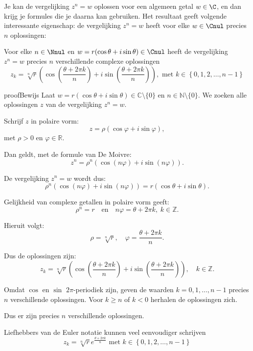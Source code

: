 \documentclass{ximera}
\begin{document}
Je kan de vergelijking $z^n=w$ oplossen voor een algemeen getal $w\in\C$, en dan krijg je formules die je daarna kan gebruiken. 
Het resultaat geeft volgende interessante eigenschap: de vergelijking $z^n=w$ heeft voor elke $w\in\Cnul$ precies $n$ oplossingen:

\begin{proposition}
    Voor elke $n\in\Nnul$ en $w=r(\cos\theta+i\sin\theta) \in\Cnul$ heeft de vergelijking $z^n = w$ precies $n$ verschillende complexe oplossingen
    $$
    z_k = \sqrt[n]{r}\left( \cos\left( \frac{\theta + 2\pi k}{n}\right) + i\sin\left( \frac{\theta + 2\pi k}{n}\right) \right), \text{ met } k\in\left\{0,1,2,\ldots,n-1\right\}
    $$
\end{proposition}

\begin{expandable}{proof}{Bewijs}
Laat $w = r(\cos\theta + i\sin\theta) \in \mathbb{C}\setminus\{0\}$ en $n \in \mathbb{N}\setminus\{0\}$.
We zoeken alle oplossingen $z$ van de vergelijking $z^n = w$.

Schrijf $z$ in polaire vorm:
$$
z = \rho(\cos\varphi + i\sin\varphi),
$$
met $\rho > 0$ en $\varphi \in \mathbb{R}$.

Dan geldt, met de formule van De Moivre:
$$
z^n = \rho^n \left( \cos(n\varphi) + i\sin(n\varphi) \right).
$$

De vergelijking $z^n = w$ wordt dus:
$$
\rho^n \left( \cos(n\varphi) + i\sin(n\varphi) \right)
= r(\cos\theta + i\sin\theta).
$$

Gelijkheid van complexe getallen in polaire vorm geeft:
$$
\rho^n = r \quad \text{en} \quad n\varphi = \theta + 2\pi k,\; k \in \mathbb{Z}.
$$

Hieruit volgt:
$$
\rho = \sqrt[n]{r}, \quad \varphi = \frac{\theta + 2\pi k}{n}.
$$

Dus de oplossingen zijn:
$$
z_k = \sqrt[n]{r}\left( \cos\left( \frac{\theta + 2\pi k}{n}\right) + i\sin\left( \frac{\theta + 2\pi k}{n}\right) \right), \quad k \in \mathbb{Z}.
$$

Omdat $\cos$ en $\sin$ $2\pi$-periodiek zijn, geven de waarden $k = 0,1,\ldots,n-1$ precies $n$ verschillende oplossingen. Voor $k \ge n$ of $k < 0$ herhalen de oplossingen zich.

Dus er zijn precies $n$ verschillende oplossingen.

\end{expandable}

Liefhebbers van de Euler notatie kunnen veel eenvoudiger schrijven
$$
    z_k = \sqrt[n]{r} e^\frac{\theta + 2\pi k}{n} \text{ met } k\in\left\{0,1,2,\ldots,n-1\right\}
$$
\end{document}
